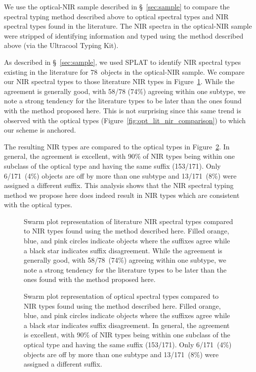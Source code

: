 \documentclass[modern]{aastex61}
\newcommand{\sample}{171}
\begin{document}
We use the optical-NIR sample described in \S~\ref{sec:sample} to compare the spectral typing method described above to optical spectral types and NIR spectral types found in the literature.
The NIR spectra in the optical-NIR sample were stripped of identifying information and typed using the method described above (via the Ultracool Typing Kit).

As described in  \S~\ref{sec:sample}, we used SPLAT to identify NIR spectral types existing in the literature for 78~objects in the optical-NIR sample.
We compare our NIR spectral types to those literature NIR types in Figure~\ref{fig:Lit NIR comparison}.
While the agreement is generally good, with 58/78 (74\%) agreeing within one subtype, we note a strong tendency for the literature types to be later than the ones found with the method proposed here.
This is not surprising since this same trend is observed with the optical types (Figure~\ref{fig:opt_lit_nir_comparison}) to which our scheme is anchored.

The resulting NIR types are compared to the optical types in Figure~\ref{fig:optical NIR comparison}.
In general, the agreement is excellent, with 90\% of NIR types being within one subclass of the optical type and having the same suffix (153/\sample).
Only 6/\sample~(4\%) objects are off by more than one subtype and 13/\sample~(8\%) were assigned a different suffix.
This analysis shows that the NIR spectral typing method we propose here does indeed result in NIR types which are consistent with the optical types.

\begin{figure}
  \caption{Swarm plot representation of literature NIR spectral types compared to NIR types found using the method described here.
  Filled orange, blue, and pink circles indicate objects where the suffixes agree while a black star indicates suffix disagreement.
  While the agreement is generally good, with 58/78~(74\%) agreeing within one subtype, we note a strong tendency for the literature types to be later than the ones found with the method proposed here.}
  \label{fig:Lit NIR comparison}
\end{figure}

\begin{figure}
  \caption{Swarm plot representation of optical spectral types compared to NIR types found using the method described here.
  Filled orange, blue, and pink circles indicate objects where the suffixes agree while a black star indicates suffix disagreement.
  In general, the agreement is excellent, with 90\% of NIR types being within one subclass of the optical type and having the same suffix (153/\sample).
  Only 6/\sample~(4\%) objects are off by more than one subtype and 13/\sample~(8\%) were assigned a different suffix.}
  \label{fig:optical NIR comparison}
\end{figure}
\end{document}

